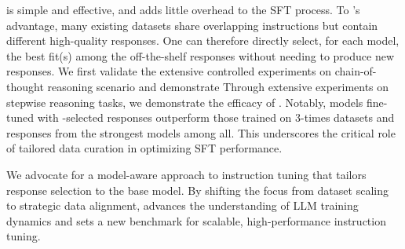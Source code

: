 \name is simple and effective, and adds little overhead to the SFT process.
To \name's advantage, many existing datasets share overlapping instructions but contain different high-quality responses. One can therefore directly select, for each model, the best fit(s) among the off-the-shelf responses without needing to produce new responses. 
We first validate the  extensive controlled experiments on chain-of-thought reasoning scenario and demonstrate 
Through extensive experiments on stepwise reasoning tasks, we demonstrate the efficacy of \name. Notably, models fine-tuned with \name-selected responses outperform those trained on 3-times datasets and responses from the strongest models among all. This underscores the critical role of tailored data curation in optimizing SFT performance.


We advocate for a model-aware approach to instruction tuning that tailors response selection to the base model. By shifting the focus from dataset scaling to strategic data alignment, \name advances the understanding of LLM training dynamics and sets a new benchmark for scalable, high-performance instruction tuning.
